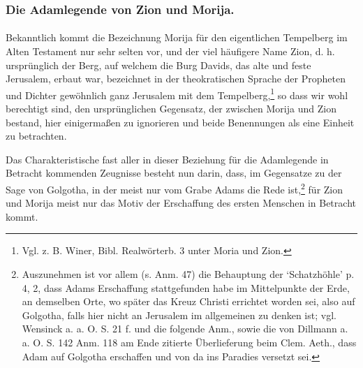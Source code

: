\documentclass[a4paper, 11pt, oneside]{article}
\begin{document}
\subsubsection{Die Adamlegende von Zion und Morija.}
\paragraph{}
Bekanntlich kommt die Bezeichnung Morija für den eigentlichen Tempelberg im Alten Testament nur sehr selten vor, und der viel häufigere Name Zion, d. h. ursprünglich der Berg, auf welchem die Burg Davids, das alte und feste Jerusalem, erbaut war, bezeichnet in der theokratischen Sprache der Propheten und Dichter gewöhnlich ganz Jerusalem mit dem Tempelberg,\footnote{Vgl. z. B. Winer, Bibl. Realwörterb. 3 unter Moria und Zion.} so dass wir wohl berechtigt sind, den ursprünglichen Gegensatz, der zwischen Morija und Zion bestand, hier einigermaßen zu ignorieren und beide Benennungen als eine Einheit zu betrachten.

Das Charakteristische fast aller in dieser Beziehung für die Adamlegende in Betracht kommenden Zeugnisse besteht nun darin, dass, im Gegensatze zu der Sage von Golgotha, in der meist nur vom Grabe Adams die Rede ist,\footnote{Auszunehmen ist vor allem (s. Anm. 47) die Behauptung der `Schatzhöhle' p. 4, 2, dass Adams Erschaffung stattgefunden habe im Mittelpunkte der Erde, an demselben Orte, wo später das Kreuz Christi errichtet worden sei, also auf Golgotha, falls hier nicht an Jerusalem im allgemeinen zu denken ist; vgl. Wensinck a. a. O. S. 21 f. und die folgende Anm., sowie die von Dillmann a. a. O. S. 142 Anm. 118 am Ende zitierte Überlieferung beim Clem. Aeth., dass Adam auf Golgotha erschaffen und von da ins Paradies versetzt sei.} für Zion und Morija meist nur das Motiv der Erschaffung des ersten Menschen in Betracht kommt.
\end{document}
